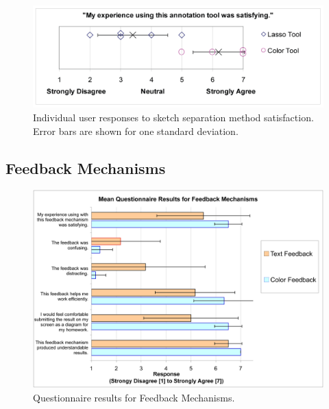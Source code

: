 \documentclass{elsart}
\begin{document}
\begin{figure}[tb]
  \centering
  \includegraphics[width=1.0\linewidth]{annotationSatisfying.png}
  \caption{\label{fig:annotationSatisfaction} Individual user
           responses to sketch separation method satisfaction.  Error bars are shown for
           one standard deviation.}
           
\end{figure}



\subsection{Feedback Mechanisms}

\begin{figure}[tb]
  \centering
  \includegraphics[width=.9\linewidth]{QuestionnaireResultsFeedback.png}
  \caption{\label{fig:qResultsFeedback}
           Questionnaire results for Feedback Mechanisms. }
\end{figure}
\end{document}
